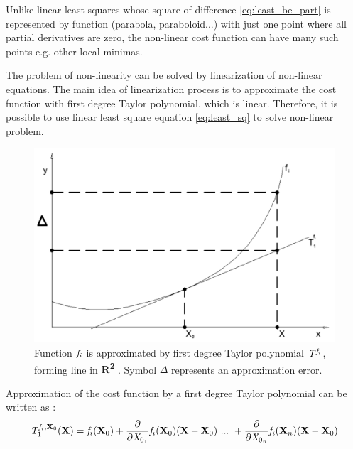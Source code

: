 \documentclass[a4paper,12pt]{article}
\newcommand{\evect}[1]{%
{\bf #1}%
}
\newcommand{\escal}[1]{%
{\it #1}%
}
\newcommand{\eucl}[1]{%
{\bf R\textsuperscript{#1}}%
}
\newcommand{\efunc}[1]{%
{\it #1}%
}
\begin{document}
Unlike linear least squares whose square of difference \eqref{eq:least_be_part}
is represented by function  (parabola, paraboloid...) with just one point where all
partial derivatives are zero, the non-linear cost function can have many such points e.g. other local minimas. 

The problem of non-linearity can be solved by linearization of non-linear equations.
The main idea of linearization process is to approximate the cost function with first degree Taylor polynomial,
which is linear. Therefore, it is possible to use linear least square equation \eqref{eq:least_sq} 
to solve non-linear problem. 

\begin{figure}[h]
    \centering
    \includegraphics[scale=0.2]{figures/taylor.png}
    \caption{Function $\efunc{f}_{i}$ is approximated by first degree Taylor polynomial $\efunc{T} ^{\efunc{f}_{i}}$,
     forming line in \eucl{2}. Symbol $\Delta$ represents an approximation error.}
    \label{fig:taylor}
\end{figure}


Approximation of the cost function by a first degree Taylor polynomial can be written as \cite{cadaprednaskove}:
\begin{equation}
\efunc{T} ^{\efunc{f}_{i}, \evect{X}_{0}}_{1} (\evect{X}) = 
	      \efunc{f}_{i}(\evect{X}_{0}) + 
               \frac{\partial}{\partial {\escal{X}_{0_{1}}}} \efunc{f}_{i} (\evect{X}_{0}) (\evect{X} -  \evect{X}_{0}) 
\ ... \ + \frac{\partial}{\partial {\escal{X}_{0_{n}}}} \efunc{f_{i}}(\evect{X}_{n}) (\evect{X} - \evect{X}_{0}) 
\end{equation}

\end{document}
